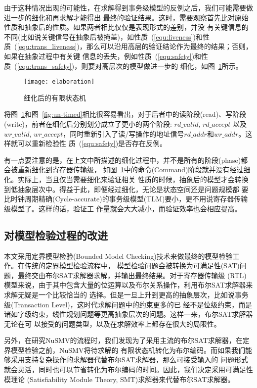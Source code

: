 由于这种情况出现的可能性，在求解得到事务级模型的反例之后，我们可能需要做进一步的细化和再求解才能得出
最终的验证结果。这时，需要观察首先比对原始性质和抽象后的性质。如果两者相比仅仅是表现形式的差别，并没
有关键信息的不同(比如说关键信号在抽象后被掩盖)，如性质~(\ref{equ:liveness})和性
质~(\ref{equ:trans_liveness})，那么可以沿用高层的验证结论作为最终的结果；否则，如果在抽象过程中有关键
信息的丢失，例如性质~(\ref{equ:safety})和性质~(\ref{equ:trans_safety})，则要对高层次的模型做进一步的
细化，如图~\ref{fig:elaboration}所示。

\begin{figure}[hl]
  \centering
  \texttt{[image: elaboration]}
  \caption{细化后的有限状态机}
  \label{fig:elaboration}
\end{figure}

将图~\ref{fig:elaboration}和图~\ref{fig:un-timed}相比很容易看出，对于后者中的读阶段(read)、写阶段
(write)，前者在细化后分别划分成立了更小的两个阶段: $rd\_valid$, $rd\_accept$ 以及 $wr\_valid$,
$wr\_accept$，同时重新引入了读/写操作的地址信号$rd\_addr$和$wr\_addr$。这样就可以重新检验性
质~(\ref{equ:safety})是否存在反例。

有一点要注意的是，在上文中所描述的细化过程中，并不是所有的阶段(phase)都会被重新细化到寄存器传输级，
如图~\ref{fig:elaboration}中的命令(Command)阶段就并没有经过细化。实际上，当且仅当需要细化来验证相关
性质的时候，抽象后的模型才会转换到低抽象层次中。得益于此，即便经过细化，无论是状态空间还是问题规模都
要比时钟周期精确(Cycle-accurate)的事务级模型(TLM)要小，更不用说寄存器传输级模型了。这样的话，验证工
作量就会大大减小，而验证效率也会相应提高。

\subsection{对模型检验过程的改进}
\label{sec:improve_model_checking}

本文采用定界模型检验(Bounded Model Checking)技术来做最终的模型检验工作。在传统的定界模型检验流程中，
模型检验问题会被转换为可满足性(SAT)问题，最终交由布尔SAT求解器求解，并输出最终结果。对于寄存器传输级
(RTL)模型来说，由于其中包含大量的位运算以及布尔关系操作，利用布尔SAT求解器来求解无疑是一个比较恰当的
选择。但是一旦上升到更高的抽象层次，比如说事务级(Transaction Level)，这时代求解问题中的约束更多的已
经不是位级约束，而是诸如字级约束，线性规划问题等更高抽象层次的问题。这样一来，布尔SAT求解器无论在可
以接受的问题类型，以及在求解效率上都存在很大的局限性。

另外，在研究NuSMV的流程时，我们发现为了采用主流的布尔SAT求解器，在定界模型检验之前，NuSMV将待求解的
有限状态机转化为布尔编码。而如果我们能够采用支持复杂操作的求解器代替布尔SAT求解器，那么可接受输入的
问题形式就会灵活，同时也可以节省转化为布尔编码的时间。因此，我们决定采用可满足性模理论
(Satisfiability Module Theory, SMT)求解器来代替布尔SAT求解器。

